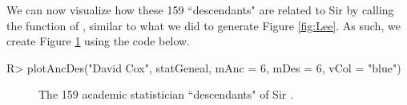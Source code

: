\documentclass[article,shortnames]{jss}
\begin{document}
We can now visualize how these 159 ``descendants" are related to Sir  by calling the  function of , similar to what we did to generate Figure \ref{fig:Lee}. As such, we create Figure \ref{fig:dCox} using the code below.

\begin{CodeInput}
R> plotAncDes("David Cox", statGeneal, mAnc = 6, mDes = 6, vCol = "blue")
\end{CodeInput}

\begin{figure}%
    \centering
    \caption{The 159 academic statistician ``descendants" of Sir .}
    \label{fig:dCox}
\end{figure}
\end{document}
